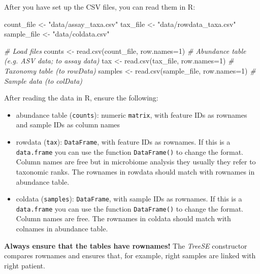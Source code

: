 \documentclass[
]{book}
\newenvironment{Shaded}{\begin{snugshade}}{\end{snugshade}}
\newcommand{\AttributeTok}[1]{\textcolor[rgb]{0.77,0.63,0.00}{#1}}
\newcommand{\CommentTok}[1]{\textcolor[rgb]{0.56,0.35,0.01}{\textit{#1}}}
\newcommand{\DecValTok}[1]{\textcolor[rgb]{0.00,0.00,0.81}{#1}}
\newcommand{\FunctionTok}[1]{\textcolor[rgb]{0.00,0.00,0.00}{#1}}
\newcommand{\NormalTok}[1]{#1}
\newcommand{\OtherTok}[1]{\textcolor[rgb]{0.56,0.35,0.01}{#1}}
\newcommand{\StringTok}[1]{\textcolor[rgb]{0.31,0.60,0.02}{#1}}
\begin{document}
After you have set up the CSV files, you can read them in R:

\begin{Shaded}
\begin{Highlighting}[]
\NormalTok{count\_file  }\OtherTok{\textless{}{-}} \StringTok{"data/assay\_taxa.csv"}
\NormalTok{tax\_file    }\OtherTok{\textless{}{-}} \StringTok{"data/rowdata\_taxa.csv"}
\NormalTok{sample\_file }\OtherTok{\textless{}{-}} \StringTok{"data/coldata.csv"}

\CommentTok{\# Load files}
\NormalTok{counts  }\OtherTok{\textless{}{-}} \FunctionTok{read.csv}\NormalTok{(count\_file, }\AttributeTok{row.names=}\DecValTok{1}\NormalTok{)   }\CommentTok{\# Abundance table (e.g. ASV data; to assay data)}
\NormalTok{tax     }\OtherTok{\textless{}{-}} \FunctionTok{read.csv}\NormalTok{(tax\_file, }\AttributeTok{row.names=}\DecValTok{1}\NormalTok{)     }\CommentTok{\# Taxonomy table (to rowData)}
\NormalTok{samples }\OtherTok{\textless{}{-}} \FunctionTok{read.csv}\NormalTok{(sample\_file, }\AttributeTok{row.names=}\DecValTok{1}\NormalTok{)  }\CommentTok{\# Sample data (to colData)}
\end{Highlighting}
\end{Shaded}

After reading the data in R, ensure the following:

\begin{itemize}
\item
  abundance table (\texttt{counts}): numeric \texttt{matrix}, with feature IDs as
  rownames and sample IDs as column names
\item
  rowdata (\texttt{tax}): \texttt{DataFrame}, with feature IDs as rownames. If this
  is a \texttt{data.frame} you can use the function \texttt{DataFrame()} to change
  the format. Column names are free but in microbiome analysis they
  usually they refer to taxonomic ranks. The rownames in rowdata
  should match with rownames in abundance table.
\item
  coldata (\texttt{samples}): \texttt{DataFrame}, with sample IDs as rownames. If
  this is a \texttt{data.frame} you can use the function \texttt{DataFrame()} to
  change the format. Column names are free. The rownames in coldata
  should match with colnames in abundance table.
\end{itemize}

\textbf{Always ensure that the tables have rownames!} The \emph{TreeSE} constructor compares
rownames and ensures that, for example, right samples are linked with right patient.
\end{document}
